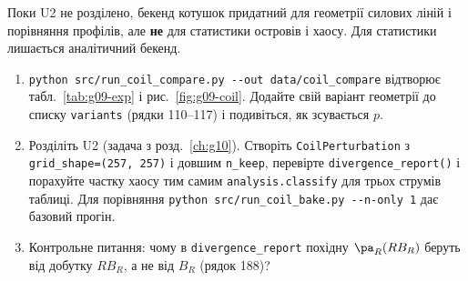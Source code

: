 Поки U2 не розділено, бекенд котушок придатний для геометрії силових ліній і порівняння
профілів, але \textbf{не} для статистики островів і хаосу. Для статистики лишається аналітичний
бекенд.

\begin{practicum}[котушки]
\begin{enumerate}
\item \verb|python src/run_coil_compare.py --out data/coil_compare| відтворює
      табл.~\ref{tab:g09-exp} і рис.~\ref{fig:g09-coil}. Додайте свій варіант геометрії до
      списку \texttt{variants} (рядки 110--117) і подивіться, як зсувається $p$.
\item Розділіть U2 (задача з розд.~\ref{ch:g10}). Створіть \texttt{CoilPerturbation} з
      \verb|grid_shape=(257, 257)| і довшим \verb|n_keep|, перевірте \verb|divergence_report()| і
      порахуйте частку хаосу тим самим \texttt{analysis.classify} для трьох струмів таблиці.
      Для порівняння \verb|python src/run_coil_bake.py --n-only 1| дає базовий прогін.
\item Контрольне питання: чому в \texttt{divergence\_report} похідну $\pa_R(RB_R)$ беруть від
      добутку $RB_R$, а не від $B_R$ (рядок 188)?
\end{enumerate}
\end{practicum}
